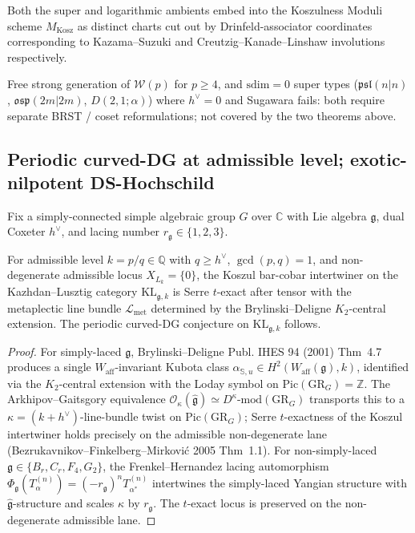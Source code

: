 \documentclass[11pt]{article}
\begin{document}
\begin{corollary}
Both the super and logarithmic ambients embed into the Koszulness
Moduli scheme $M_{\mathrm{Kosz}}$ as distinct charts cut out by
Drinfeld-associator coordinates corresponding to Kazama--Suzuki and
Creutzig--Kanade--Linshaw involutions respectively.
\end{corollary}

\begin{remark}
Free strong generation of $\mathcal{W}(p)$ for $p \ge 4$, and
$\mathrm{sdim} = 0$ super types ($\mathfrak{psl}(n|n)$,
$\mathfrak{osp}(2m|2m)$, $D(2,1;\alpha)$) where
$h^{\vee} = 0$ and Sugawara fails: both require separate
BRST / coset reformulations; not covered by the two theorems above.
\end{remark}

\subsection{Periodic curved-DG at admissible level; exotic-nilpotent DS-Hochschild}
\label{subsec:periodic-cdg-universal}

Fix a simply-connected simple algebraic group $G$ over $\mathbb{C}$
with Lie algebra $\mathfrak{g}$, dual Coxeter $h^{\vee}$, and lacing
number $r_{\mathfrak{g}} \in \{1, 2, 3\}$.

\begin{theorem}
\label{thm:periodic-cdg-admissible}
For admissible level $k = p/q \in \mathbb{Q}$ with $q \ge h^{\vee}$,
$\gcd(p, q) = 1$, and non-degenerate admissible locus $X_{L_k} = \{0\}$,
the Koszul bar-cobar intertwiner on the Kazhdan--Lusztig category
$\mathrm{KL}_{\mathfrak{g}, k}$ is Serre $t$-exact after tensor with
the metaplectic line bundle $\mathcal{L}_{\mathrm{met}}$
determined by the Brylinski--Deligne $K_2$-central extension. The
periodic curved-DG conjecture on
$\mathrm{KL}_{\mathfrak{g}, k}$ follows.
\end{theorem}

\begin{proof}
For simply-laced $\mathfrak{g}$, Brylinski--Deligne Publ. IHES 94
(2001) Thm~4.7 produces a single $W_{\mathrm{aff}}$-invariant
Kubota class $\alpha_{\mathbb{S},u}
\in H^2(W_{\mathrm{aff}}(\mathfrak{g}), k)$, identified via the
$K_2$-central extension with the Loday symbol on
$\mathrm{Pic}(\mathrm{GR}_G) = \mathbb{Z}$. The Arkhipov--Gaitsgory
equivalence $\mathcal{O}_{\kappa}(\widehat{\mathfrak{g}})
\simeq D^{\kappa}\text{-}\mathrm{mod}(\mathrm{GR}_G)$ transports
this to a $\kappa = (k + h^{\vee})$-line-bundle twist on
$\mathrm{Pic}(\mathrm{GR}_G)$; Serre $t$-exactness of the Koszul
intertwiner holds precisely on the admissible non-degenerate lane
(Bezrukavnikov--Finkelberg--Mirkovi\'c 2005 Thm~1.1).
For non-simply-laced $\mathfrak{g} \in \{B_r, C_r, F_4, G_2\}$, the
Frenkel--Hernandez lacing automorphism
$\Phi_{\mathfrak{g}}(T^{(n)}_{\alpha}) = (-r_{\mathfrak{g}})^n
T^{(n)}_{\alpha^*}$
intertwines the simply-laced Yangian structure with
$\widehat{\mathfrak{g}}$-structure and scales $\kappa$ by
$r_{\mathfrak{g}}$. The $t$-exact locus is preserved on the
non-degenerate admissible lane.
\end{proof}
\end{document}
